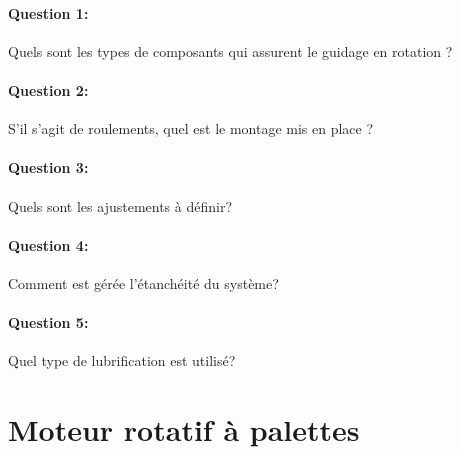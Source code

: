 \paragraph{Question 1:} Quels sont les types de composants qui assurent le guidage en rotation ?

\paragraph{Question 2:} S'il s'agit de roulements, quel est le montage mis en place ?

\paragraph{Question 3:} Quels sont les ajustements à définir?

\paragraph{Question 4:} Comment est gérée l'étanchéité du système?

\paragraph{Question 5:} Quel type de lubrification est utilisé?





\newpage

\section{Moteur rotatif à palettes}

